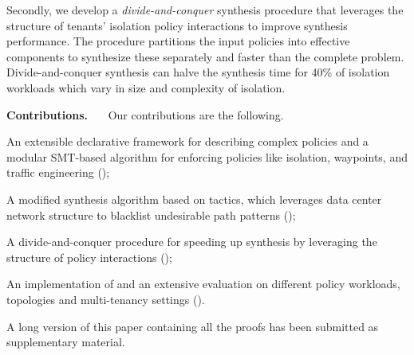  Secondly, we develop a \emph{divide-and-conquer}
 synthesis
 procedure that leverages the structure of tenants'
 isolation policy interactions to improve synthesis performance. The
  procedure partitions the input policies
  into effective components to synthesize these
  separately and faster than the complete problem. 
 Divide-and-conquer synthesis can halve the
 synthesis time for 40\% of isolation workloads  
 which vary in size and complexity of isolation.


\noindent \textbf{Contributions.} \ \ \ Our contributions are the following.
\begin{compactitemize}
\item An extensible declarative framework for describing
  complex policies and a modular SMT-based algorithm for enforcing policies
  like isolation, waypoints, and traffic engineering ();
\item A modified synthesis algorithm based on tactics, which leverages data center network structure
  to blacklist undesirable path patterns ();
\item A divide-and-conquer procedure for speeding up synthesis by leveraging the 
structure of policy interactions ();
\item An implementation of \Name and an extensive evaluation on different policy workloads, topologies and multi-tenancy settings ().
\end{compactitemize}

\iffull\else
A long version
of this paper containing all the proofs has been submitted as supplementary material.
\fi

